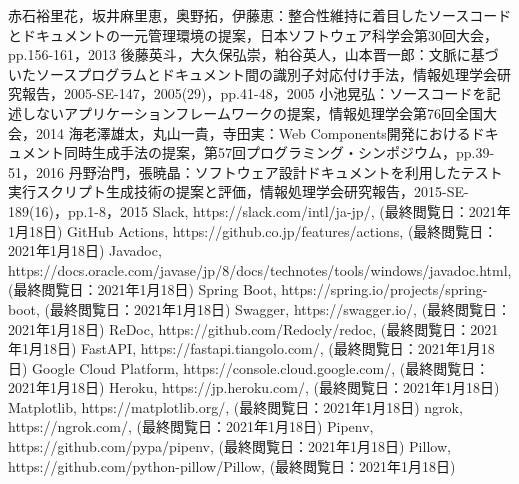 \begin{thebibliography}{9}
     赤石裕里花，坂井麻里恵，奥野拓，伊藤恵：整合性維持に着目したソースコードとドキュメントの一元管理環境の提案，日本ソフトウェア科学会第30回大会，pp.156-161，2013
     後藤英斗，大久保弘崇，粕谷英人，山本晋一郎：文脈に基づいたソースプログラムとドキュメント間の識別子対応付け手法，情報処理学会研究報告，2005-SE-147，2005(29)，pp.41-48，2005
     小池晃弘：ソースコードを記述しないアプリケーションフレームワークの提案，情報処理学会第76回全国大会，2014
     海老澤雄太，丸山一貴，寺田実：Web Components開発におけるドキュメント同時生成手法の提案，第57回プログラミング・シンポジウム，pp.39-51，2016
     丹野治門，張暁晶：ソフトウェア設計ドキュメントを利用したテスト実行スクリプト生成技術の提案と評価，情報処理学会研究報告，2015-SE-189(16)，pp.1-8，2015
     Slack, https://slack.com/intl/ja-jp/, (最終閲覧日：2021年1月18日)
     GitHub Actions, https://github.co.jp/features/actions, (最終閲覧日：2021年1月18日)
     Javadoc, https://docs.oracle.com/javase/jp/8/docs/technotes/tools/windows/javadoc.html, (最終閲覧日：2021年1月18日)
     Spring Boot, https://spring.io/projects/spring-boot, (最終閲覧日：2021年1月18日)
     Swagger, https://swagger.io/, (最終閲覧日：2021年1月18日)
     ReDoc, https://github.com/Redocly/redoc, (最終閲覧日：2021年1月18日)
     FastAPI, https://fastapi.tiangolo.com/, (最終閲覧日：2021年1月18日)
     Google Cloud Platform, https://console.cloud.google.com/, (最終閲覧日：2021年1月18日)
     Heroku, https://jp.heroku.com/, (最終閲覧日：2021年1月18日)
     Matplotlib, https://matplotlib.org/, (最終閲覧日：2021年1月18日)
     ngrok, https://ngrok.com/, (最終閲覧日：2021年1月18日)
     Pipenv, https://github.com/pypa/pipenv, (最終閲覧日：2021年1月18日)
     Pillow, https://github.com/python-pillow/Pillow, (最終閲覧日：2021年1月18日)
\end{thebibliography}